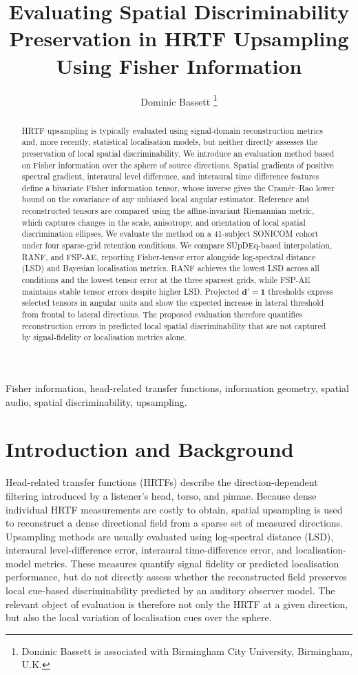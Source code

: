 \documentclass[journal]{IEEEtran}
\title{Evaluating Spatial Discriminability Preservation in HRTF Upsampling Using Fisher Information}
\author{Dominic Bassett%
\thanks{Dominic Bassett is associated with Birmingham City University, Birmingham, U.K.}}
\begin{document}
\maketitle

\begin{abstract}
HRTF upsampling is typically evaluated using signal-domain reconstruction metrics and, more recently, statistical localisation models, but neither directly assesses the preservation of local spatial discriminability. We introduce an evaluation method based on Fisher information over the sphere of source directions. Spatial gradients of positive spectral gradient, interaural level difference, and interaural time difference features define a bivariate Fisher information tensor, whose inverse gives the Cramér–Rao lower bound on the covariance of any unbiased local angular estimator. Reference and reconstructed tensors are compared using the affine-invariant Riemannian metric, which captures changes in the scale, anisotropy, and orientation of local spatial discrimination ellipses. We evaluate the method on a 41-subject SONICOM cohort under four sparse-grid retention conditions. We compare SUpDEq-based interpolation, RANF, and FSP-AE, reporting Fisher-tensor error alongside log-spectral distance (LSD) and Bayesian localisation metrics. RANF achieves the lowest LSD across all conditions and the lowest tensor error at the three sparsest grids, while FSP-AE maintains stable tensor errors despite higher LSD. Projected \(\bm{d'=1}\) thresholds express selected tensors in angular units and show the expected increase in lateral threshold from frontal to lateral directions. The proposed evaluation therefore quantifies reconstruction errors in predicted local spatial discriminability that are not captured by signal-fidelity or localisation metrics alone.
\end{abstract}

\begin{IEEEkeywords}
Fisher information, head-related transfer functions, information geometry,
spatial audio, spatial discriminability, upsampling.
\end{IEEEkeywords}

\section{Introduction and Background}

Head-related transfer functions (HRTFs) describe the direction-dependent filtering introduced by a listener’s head, torso, and pinnae. Because dense individual HRTF measurements are costly to obtain, spatial upsampling is used to reconstruct a dense directional field from a sparse set of measured directions. Upsampling methods are usually evaluated using log-spectral distance (LSD), interaural level-difference error, interaural time-difference error, and localisation-model metrics. These measures quantify signal fidelity or predicted localisation performance, but do not directly assess whether the reconstructed field preserves local cue-based discriminability predicted by an auditory observer model. The relevant object of evaluation is therefore not only the HRTF at a given direction, but also the local variation of localisation cues over the sphere.
\end{document}
